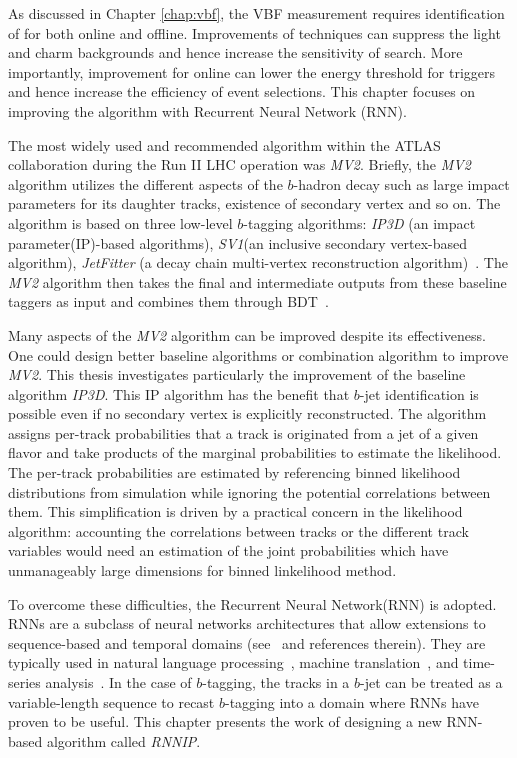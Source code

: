 As discussed in Chapter \ref{chap:vbf}, the VBF \Hbb measurement requires identification of \bjets for both online and offline. Improvements of \btagging techniques can suppress the light and charm backgrounds and hence increase the sensitivity of \Hbb search. More importantly, improvement for online \btagging can lower the energy threshold for \bjet triggers and hence increase the efficiency of \Hbb event selections. This chapter focuses on improving the \btagging algorithm with Recurrent Neural Network (RNN). 

The most widely used and recommended \btagging algorithm within the ATLAS collaboration during the Run II LHC operation was \textit{MV2}. Briefly, the \textit{MV2} algorithm utilizes the different aspects of the $b$-hadron decay such as large impact parameters for its daughter tracks, existence of secondary vertex and so on. The algorithm is based on three low-level $b$-tagging algorithms: \textit{IP3D} (an impact parameter(IP)-based algorithms), \textit{SV1}(an inclusive secondary vertex-based algorithm), \textit{JetFitter} (a decay chain multi-vertex reconstruction algorithm)~\cite{ref:btagPaper}. The \textit{MV2} algorithm then takes the final and intermediate outputs from these baseline taggers as input and combines them through BDT~\cite{ATL-PHYS-PUB-2016-012}.

Many aspects of the \textit{MV2} algorithm can be improved despite its effectiveness. One could design better baseline algorithms or combination algorithm to improve \textit{MV2}. This thesis investigates particularly the improvement of the baseline algorithm \textit{IP3D}. This IP algorithm has the benefit that $b$-jet identification is possible even if no secondary vertex is explicitly reconstructed. The algorithm assigns per-track probabilities that a track is originated from a jet of a given flavor and take products of the marginal probabilities to estimate the likelihood. The per-track probabilities are estimated by referencing binned likelihood distributions from simulation while ignoring the potential correlations between them. This simplification is driven by a practical concern in the likelihood algorithm: accounting the correlations between tracks or the different track variables would need an estimation of the joint probabilities which have unmanageably large dimensions for binned linkelihood method.

To overcome these difficulties, the Recurrent Neural Network(RNN) is adopted. RNNs are a subclass of neural networks architectures that allow extensions to sequence-based and temporal domains (see~\cite{ref:RNNthesis} and references therein). They are typically used in natural language processing~\cite{languagemodel,DBLP:journals/corr/abs-1303-5778}, machine translation~\cite{MT,MT2}, and time-series analysis~\cite{timeseries,timeseries2}. In the case of $b$-tagging, the tracks in a $b$-jet can be treated as a variable-length sequence to recast $b$-tagging into a domain where RNNs have proven to be useful. This chapter presents the work of designing a new RNN-based \btagging algorithm called \textit{RNNIP}.
